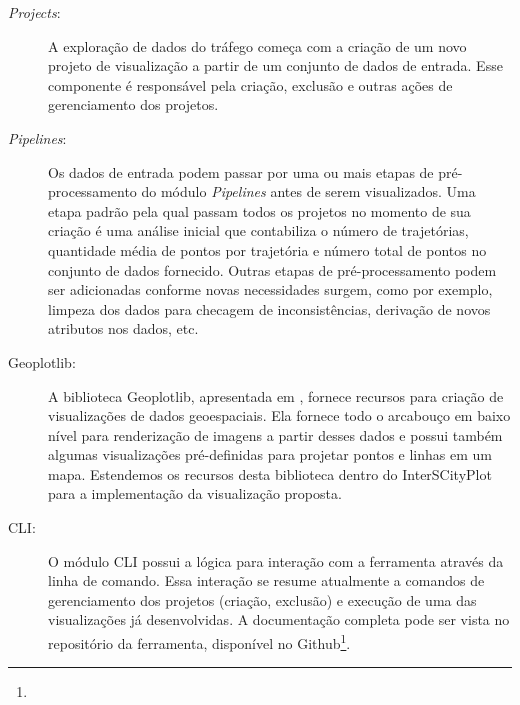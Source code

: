 \begin{description}
  \item[\emph{Projects}:] A exploração de dados do tráfego começa com a criação de um
novo projeto de visualização a partir de um conjunto de dados de entrada. Esse
componente é responsável pela criação, exclusão e outras ações de gerenciamento
dos projetos.

  \item[\emph{Pipelines}:] Os dados de entrada podem passar por uma ou mais
etapas de pré-processamento do módulo \emph{Pipelines} antes de serem
visualizados. Uma etapa padrão pela qual passam todos os projetos no momento de
sua criação é uma análise inicial que contabiliza o número de trajetórias,
quantidade média de pontos por trajetória e número total de pontos no conjunto
de dados fornecido. Outras etapas de pré-processamento podem ser adicionadas
conforme novas necessidades surgem, como por exemplo, limpeza dos dados para
checagem de inconsistências, derivação de novos atributos nos dados, etc.

  \item[Geoplotlib:] A biblioteca Geoplotlib, apresentada em
\citet{Andrea2016}, fornece recursos para criação de visualizações de dados
geoespaciais. Ela fornece todo o arcabouço em baixo nível para renderização de
imagens a partir desses dados e possui também algumas visualizações
pré-definidas para projetar pontos e linhas em um mapa.  Estendemos os recursos
desta biblioteca dentro do InterSCityPlot para a implementação da visualização
proposta.

  \item[CLI:] O módulo CLI possui a lógica para interação com a ferramenta
através da linha de comando. Essa interação se resume atualmente a comandos de
gerenciamento dos projetos (criação, exclusão) e execução de uma das
visualizações já desenvolvidas. A documentação completa pode ser vista no
repositório da ferramenta, disponível no
Github\footnote{}.

\end{description}
